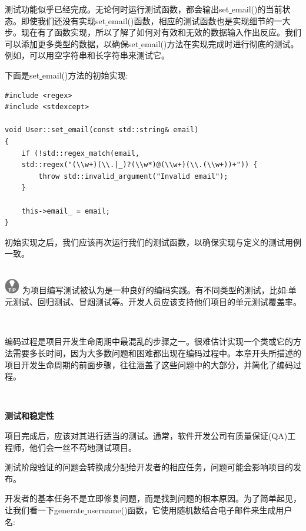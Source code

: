 测试功能似乎已经完成。无论何时运行测试函数，都会输出set\underline{ }email()的当前状态。即使我们还没有实现set\underline{ }email()函数，相应的测试函数也是实现细节的一大步。现在有了函数实现，所以了解了如何对有效和无效的数据输入作出反应。我们可以添加更多类型的数据，以确保set\underline{ }email()方法在实现完成时进行彻底的测试。例如，可以用空字符串和长字符串来测试它。 \par
下面是set\underline{ }email()方法的初始实现: \par

\begin{lstlisting}[caption={}]
#include <regex>
#include <stdexcept>

void User::set_email(const std::string& email)
{
	if (!std::regex_match(email,
	std::regex("(\\w+)(\\.|_)?(\\w*)@(\\w+)(\\.(\\w+))+")) {
		throw std::invalid_argument("Invalid email");
	}

	this->email_ = email;
}
\end{lstlisting}

初始实现之后，我们应该再次运行我们的测试函数，以确保实现与定义的测试用例一致。 \par

\hspace*{\fill} \\ %
\includegraphics[width=0.05\textwidth]{images/tip}
为项目编写测试被认为是一种良好的编码实践。有不同类型的测试，比如:单元测试、回归测试、冒烟测试等。开发人员应该支持他们项目的单元测试覆盖率。 \par
\noindent\textbf{}\ \par

编码过程是项目开发生命周期中最混乱的步骤之一。很难估计实现一个类或它的方法需要多长时间，因为大多数问题和困难都出现在编码过程中。本章开头所描述的项目开发生命周期的前面步骤，往往涵盖了这些问题中的大部分，并简化了编码过程。 \par

\noindent\textbf{}\ \par
\textbf{测试和稳定性} \ \par
项目完成后，应该对其进行适当的测试。通常，软件开发公司有质量保证(QA)工程师，他们会一丝不苟地测试项目。 \par
测试阶段验证的问题会转换成分配给开发者的相应任务，问题可能会影响项目的发布。 \par
开发者的基本任务不是立即修复问题，而是找到问题的根本原因。为了简单起见，让我们看一下generate\underline{ }username()函数，它使用随机数结合电子邮件来生成用户名: \par

